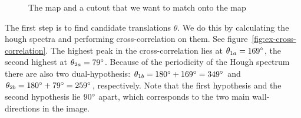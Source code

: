 \begin{figure}[ht]
\centering
{}
\caption{The map and a cutout that we want to match onto the map}
\label{fig:ex-rooms}
\end{figure}

The first step is to find candidate translations $\theta$. We do this by calculating the hough spectra and performing cross-correlation on them. See figure~\ref{fig:ex-cross-correlation}. The highest peak in the cross-correlation lies at $\theta_{1a} = 169\degree$, the second highest at $\theta_{2a} = 79\degree$. Because of the periodicity of the Hough spectrum there are also two dual-hypothesis: $\theta_{1b} = 180\degree+169\degree = 349\degree$ and $\theta_{2b} = 180\degree+79\degree = 259\degree$, respectively. Note that the first hypothesis and the second hypothesis lie $90\degree$ apart, which corresponds to the two main wall-directions in the image.

